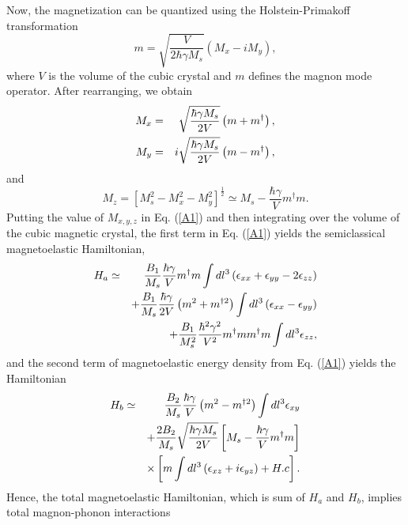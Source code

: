 \documentclass[aps,pra,superscriptaddress,balancelastpage,twocolumn]{revtex4}
\begin{document}
Now, the magnetization can be quantized using the Holstein-Primakoff transformation
\begin{equation}
m=\sqrt{\frac{V}{2\hbar \gamma M_{s}}}\left( M_{x}-iM_{y}\right) ,
\end{equation}%
where $V$ is the volume of the cubic crystal and $m$ defines the magnon mode
operator. After rearranging, we obtain
\begin{eqnarray}
M_{x} &=&\sqrt{\frac{\hbar \gamma M_{s}}{2V}}\left( m+m^{\dagger }\right) ,
\notag \\
M_{y} &=&i\sqrt{\frac{\hbar \gamma M_{s}}{2V}}\left( m-m^{\dagger }\right) ,
\end{eqnarray}%
and%
\begin{equation}
M_{z}=\left[ M_{s}^{2}-M_{x}^{2}-M_{y}^{2}\right] ^{\frac{1}{2}}\simeq M_{s}-%
\frac{\hbar \gamma }{V}m^{\dagger }m.
\end{equation}%
Putting the value of $M_{x,y,z}$ in Eq. (\ref{A1}) and then integrating over
the volume of the cubic magnetic crystal, the first term in Eq. (\ref{A1})
yields the semiclassical magnetoelastic Hamiltonian,
\begin{eqnarray}
H_{a} &\simeq &\frac{B_{1}}{M_{s}}\frac{\hbar \gamma }{V}m^{\dagger }m\int
dl^{3}\left( \epsilon _{xx}+\epsilon _{yy}-2\epsilon _{zz}\right)  \notag \\
&&+\frac{B_{1}}{M_{s}}\frac{\hbar \gamma }{2V}\left( m^{2}+m^{\dagger
2}\right) \int dl^{3}\left( \epsilon _{xx}-\epsilon _{yy}\right)  \notag \\
&&+\frac{B_{1}}{M_{s}^{2}}\frac{\hbar ^{2}\gamma ^{2}}{V^{2}}m^{\dagger
}mm^{\dagger }m\int dl^{3}\epsilon _{zz},  \label{Ha}
\end{eqnarray}%
and the second term of magnetoelastic energy density from Eq. (\ref{A1})
yields the Hamiltonian
\begin{eqnarray}
H_{b} &\simeq &\frac{B_{2}}{M_{s}}\frac{\hbar \gamma }{V}\left(
m^{2}-m^{\dagger 2}\right) \int dl^{3}\epsilon _{xy}  \notag \\
&&+\frac{2B_{2}}{M_{s}}\sqrt{\frac{\hbar \gamma M_{s}}{2V}}\left[ M_{s}-%
\frac{\hbar \gamma }{V}m^{\dagger }m\right]  \notag \\
&&\times \left[ m\int dl^{3}\left( \epsilon _{xz}+i\epsilon _{yz}\right) +H.c%
\right] .  \label{Hb}
\end{eqnarray}%
Hence, the total magnetoelastic Hamiltonian, which is sum of  $H_{a}$ and $H_{b}$, implies
total magnon-phonon interactions
\end{document}
